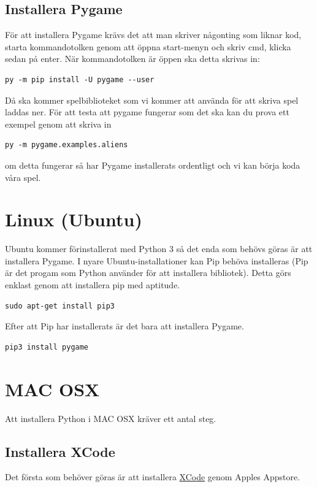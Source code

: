 \documentclass{article}
\begin{document}
\subsection{Installera Pygame}
För att installera Pygame krävs det att man skriver någonting som liknar kod, starta kommandotolken genom att öppna start-menyn och skriv cmd, klicka sedan på enter. När kommandotolken är öppen ska detta skrivas in:
\begin{lstlisting}
py -m pip install -U pygame --user
\end{lstlisting}
Då ska kommer spelbiblioteket som vi kommer att använda för att skriva spel laddas ner. För att testa att pygame fungerar som det ska kan du prova ett exempel genom att skriva in
\begin{lstlisting}
py -m pygame.examples.aliens
\end{lstlisting}
om detta fungerar så har Pygame installerats ordentligt och vi kan börja koda våra spel.

\section{Linux (Ubuntu)}
Ubuntu kommer förinstallerat med Python 3 så det enda som behövs göras är att installera Pygame. I nyare Ubuntu-installationer kan Pip behöva installeras (Pip är det progam som Python använder för att installera bibliotek). Detta görs enklast genom att installera pip med aptitude.
\begin{lstlisting}
sudo apt-get install pip3
\end{lstlisting}
Efter att Pip har installerats är det bara att installera Pygame.
\begin{lstlisting}
pip3 install pygame
\end{lstlisting}

\section{MAC OSX}
Att installera Python i MAC OSX kräver ett antal steg. 
\subsection{Installera XCode}
Det första som behöver göras är att installera \href{https://itunes.apple.com/us/app/xcode/id497799835?mt=12&ls=1}{XCode} genom Apples Appstore.
\end{document}
